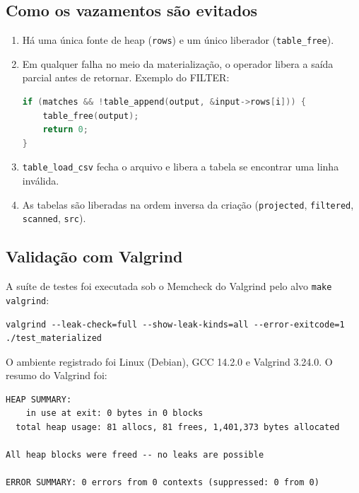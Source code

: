 \documentclass[11pt,a4paper]{article}
\begin{document}
\subsection{Como os vazamentos são evitados}
\begin{enumerate}
    \item Há uma única fonte de heap (\texttt{rows}) e um único liberador (\texttt{table\_free}).
    \item Em qualquer falha no meio da materialização, o operador libera a saída parcial antes de retornar. Exemplo do FILTER:
\par\medskip\noindent\begin{minipage}{\linewidth}
\begin{lstlisting}[language=C]
if (matches && !table_append(output, &input->rows[i])) {
    table_free(output);
    return 0;
}
\end{lstlisting}
\end{minipage}\par\medskip
    \item \texttt{table\_load\_csv} fecha o arquivo e libera a tabela se encontrar uma linha inválida.
    \item As tabelas são liberadas na ordem inversa da criação (\texttt{projected}, \texttt{filtered}, \texttt{scanned}, \texttt{src}).
\end{enumerate}

\subsection{Validação com Valgrind}\label{sec:valgrind}
A suíte de testes foi executada sob o Memcheck do Valgrind \cite{valgrind} pelo alvo \texttt{make valgrind}:
\par\medskip\noindent\begin{minipage}{\linewidth}
\begin{lstlisting}
valgrind --leak-check=full --show-leak-kinds=all --error-exitcode=1 ./test_materialized
\end{lstlisting}
\end{minipage}\par\medskip
O ambiente registrado foi Linux (Debian), GCC 14.2.0 e Valgrind 3.24.0. O resumo do Valgrind foi:
\par\medskip\noindent\begin{minipage}{\linewidth}
\begin{lstlisting}
HEAP SUMMARY:
    in use at exit: 0 bytes in 0 blocks
  total heap usage: 81 allocs, 81 frees, 1,401,373 bytes allocated

All heap blocks were freed -- no leaks are possible

ERROR SUMMARY: 0 errors from 0 contexts (suppressed: 0 from 0)
\end{lstlisting}
\end{minipage}\par\medskip
\end{document}
